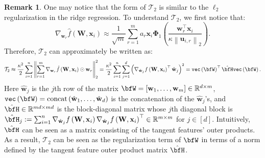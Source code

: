 \documentclass[10pt]{article} %
\theoremstyle{definition}
\newtheorem{remark}[theorem]{Remark}
\theoremstyle{plain}
\newcommand{\paren}[1]{\left(#1\right)}
\newcommand{\norm}[1]{\left\|#1\right\|}
\providecommand{\R}{\mathbb{R}}
\def\bfu{{\mathbf{u}}}\def\bfv{{\mathbf{v}}}\def\bfw{{\mathbf{w}}}\def\bfx{{\mathbf{x}}}
\begin{document}
\begin{remark}
One may notice that the form of $\mathcal{T}_2$ is similar to the $\ell_2$ regularization in the ridge regression. To understand $\mathcal{T}_2$, we first notice that:
\[
\nabla_{\bfw_r}\hat{f}\paren{\mathbf{W},\bfx_i}\approx\frac{1}{\sqrt{m}}\sum_{r=1}^ma_r\bfx_i\bm{\Phi}_1\paren{\frac{\bfw_r^\top\bfx_i}{\kappa\norm{\bfu_{i,r}}_2}}.
\]
Therefore, $\mathcal{T}_2$ can approximately be written as:
\begin{align*}
    \mathcal{T}_2 \approx \frac{\kappa^2}{2}\sum_{i=1}^n\norm{\sum_{r=1}^m\nabla_{\bfw_r}{\hat f}\paren{\mathbf{W},\bfx_i}\odot\bfw_r}_2^2
    = \frac{\kappa^2}{2}\sum_{i=1}^n\sum_{j=1}^d\paren{\nabla_{\hat{\bfw}_j}f\paren{\mathbf{W},\bfx_i}^\top\hat{\bfw}_j}^2
    = \texttt{vec}\paren{\bfW}^\top\hat{\bfH}\texttt{vec}\paren{\bfW}.
\end{align*}
Here $\hat{\bfw}_j$ is the $j$th row of the matrix $\bfW = \left[\bfw_1,\dots,\bfw_m\right]\in\R^{d\times m}$, 
$\texttt{vec}\paren{\bfW} = \operatorname{concat}\paren{\hat{\bfw}_1,\dots,\hat{\bfw}_d}$ 
is the concatenation of the $\hat{\bfw}_j$'s, and 
$\hat{\bfH}\in\R^{md\times md}$ is the block-diagonal matrix whose $j$th diagonal block is 
$\hat{\bfH}_j := \sum_{i=1}^n \nabla_{\hat{\bfw}_j} f\paren{\mathbf{W},\bfx_i} 
\nabla_{\hat{\bfw}_j} f\paren{\mathbf{W},\bfx_i}^\top \in\R^{m\times m}$ for $j\in[d]$. 
Intuitively, $\hat{\bfH}$ can be seen as a matrix consisting of the tangent features' \citep{baratin2021implicit,lejeune2024adaptive} outer products. 
As a result, $\mathcal{T}_2$ can be seen as the regularization term of $\bfW$ in terms of a norm defined by the tangent feature outer product matrix $\hat{\bfH}$.
\end{remark}
\end{document}
